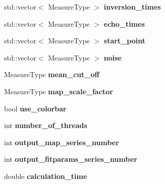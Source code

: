 \begin{DoxyCompactItemize}
\item 
\hypertarget{struct_ox_1_1_tomato_options_ab7ac986b6ad257e73eda3d524f85fe85}{std\-::vector$<$ Measure\-Type $>$ {\bfseries inversion\-\_\-times}}\label{struct_ox_1_1_tomato_options_ab7ac986b6ad257e73eda3d524f85fe85}

\item 
\hypertarget{struct_ox_1_1_tomato_options_ae70219d5c42877178575baa5d6ae51c3}{std\-::vector$<$ Measure\-Type $>$ {\bfseries echo\-\_\-times}}\label{struct_ox_1_1_tomato_options_ae70219d5c42877178575baa5d6ae51c3}

\item 
\hypertarget{struct_ox_1_1_tomato_options_a0eced6fbbc1270e5d437a18ba950c06c}{std\-::vector$<$ Measure\-Type $>$ {\bfseries start\-\_\-point}}\label{struct_ox_1_1_tomato_options_a0eced6fbbc1270e5d437a18ba950c06c}

\item 
\hypertarget{struct_ox_1_1_tomato_options_ae9352986deb21ca97d4fd34daf564241}{std\-::vector$<$ Measure\-Type $>$ {\bfseries noise}}\label{struct_ox_1_1_tomato_options_ae9352986deb21ca97d4fd34daf564241}

\item 
\hypertarget{struct_ox_1_1_tomato_options_af81d1a55409036109d253b313d59e972}{Measure\-Type {\bfseries mean\-\_\-cut\-\_\-off}}\label{struct_ox_1_1_tomato_options_af81d1a55409036109d253b313d59e972}

\item 
\hypertarget{struct_ox_1_1_tomato_options_ab245e10cf32b36c48d66208a5f505099}{Measure\-Type {\bfseries map\-\_\-scale\-\_\-factor}}\label{struct_ox_1_1_tomato_options_ab245e10cf32b36c48d66208a5f505099}

\item 
\hypertarget{struct_ox_1_1_tomato_options_aa762826a11ff767aa969bd66c29b577f}{bool {\bfseries use\-\_\-colorbar}}\label{struct_ox_1_1_tomato_options_aa762826a11ff767aa969bd66c29b577f}

\item 
\hypertarget{struct_ox_1_1_tomato_options_a54efb4945f2857ee4ed9e1d5552fc3dd}{int {\bfseries number\-\_\-of\-\_\-threads}}\label{struct_ox_1_1_tomato_options_a54efb4945f2857ee4ed9e1d5552fc3dd}

\item 
\hypertarget{struct_ox_1_1_tomato_options_ab20a779c5a8dd371ec9356e3f9ce79c9}{int {\bfseries output\-\_\-map\-\_\-series\-\_\-number}}\label{struct_ox_1_1_tomato_options_ab20a779c5a8dd371ec9356e3f9ce79c9}

\item 
\hypertarget{struct_ox_1_1_tomato_options_a58664e816cde6eff746bd5abe4fe2d1c}{int {\bfseries output\-\_\-fitparams\-\_\-series\-\_\-number}}\label{struct_ox_1_1_tomato_options_a58664e816cde6eff746bd5abe4fe2d1c}

\item 
\hypertarget{struct_ox_1_1_tomato_options_a008c932c7d65248d2d82e0e654993384}{double {\bfseries calculation\-\_\-time}}\label{struct_ox_1_1_tomato_options_a008c932c7d65248d2d82e0e654993384}

\end{DoxyCompactItemize}


